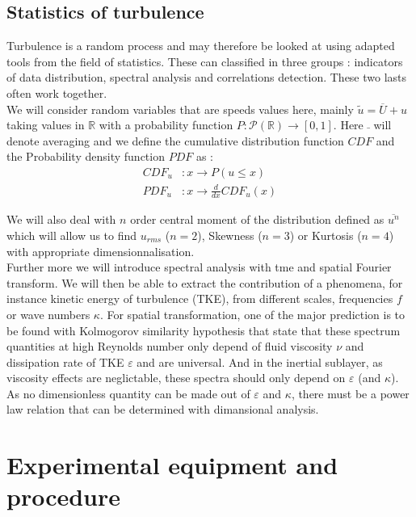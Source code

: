 \documentclass[12pt]{article}
\begin{document}
\subsection{Statistics of turbulence}

Turbulence is a random process and may therefore be looked at using adapted tools from the field of statistics. These can classified in three groups : indicators of data distribution, spectral analysis and correlations detection. These two lasts often work together.\\

We will consider random variables that are speeds values here, mainly $\tilde{u} = \overline{U} + u$ taking values in $\mathbb{R}$ with a probability function $P:\mathcal{P}(\mathbb{R})\rightarrow [0,1]$. Here $\bar{ ~ }$ will denote averaging and we define the cumulative distribution function $CDF$ and the Probability density function $PDF$ as :
\begin{align}
    CDF_u &: x \rightarrow P(u\leq x) \\
    PDF_u &: x \rightarrow \frac{d}{dx}CDF_u (x)
\end{align}

We will also deal with $n$ order central  moment of the distribution defined as $\overline{u^n}$ which will allow us to find $u_{rms}$ ($n=2$), Skewness ($n=3$) or Kurtosis ($n=4$) with appropriate dimensionnalisation. \\

Further more we will introduce spectral analysis with tme and spatial Fourier transform. We will then be able to extract the contribution of a phenomena, for instance kinetic energy of turbulence (TKE), from different scales, frequencies $f$ or wave numbers $\kappa$. For spatial transformation, one of the major prediction is to be found with Kolmogorov similarity hypothesis that state that these spectrum quantities at high Reynolds number only depend of fluid viscosity $\nu$ and dissipation rate of TKE $\varepsilon$ and are universal. And in the inertial sublayer, as viscosity effects are neglictable, these spectra should only depend on $\varepsilon$ (and $\kappa$). As no dimensionless quantity can be made out of $\varepsilon$ and $\kappa$, there must be a power law relation that can be determined with dimansional analysis.



\section{Experimental equipment and procedure}
\end{document}
